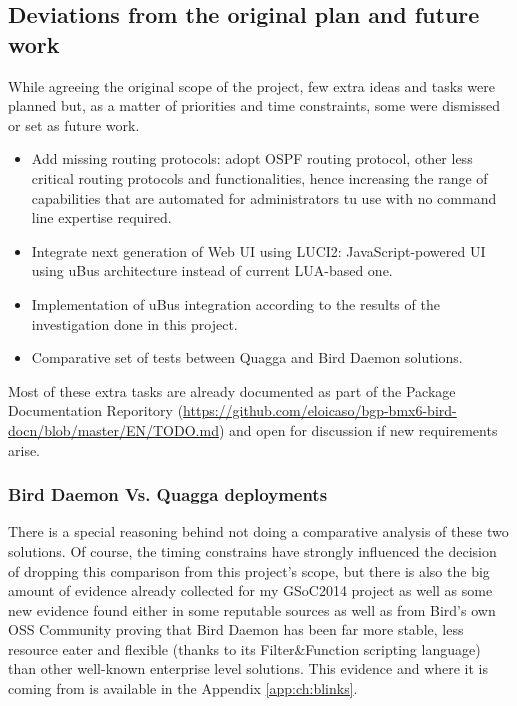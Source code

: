 \subsection{Deviations from the original plan and future work}
While agreeing the original scope of the project, few extra ideas and tasks were planned but, as a matter of priorities and time constraints, some were dismissed or set as future work.

\begin{itemize}
    \item Add missing routing protocols: adopt OSPF routing protocol, other less critical routing protocols and functionalities, hence increasing the range of capabilities that are automated for administrators tu use  with no command line expertise required.
    \item Integrate next generation of Web UI using LUCI2: JavaScript-powered UI using uBus architecture instead of current LUA-based one.
    \item Implementation of uBus integration according to the results of the investigation done in this project.
    \item Comparative set of tests between Quagga and Bird Daemon solutions.
\end{itemize}

Most of these extra tasks are already documented as part of the Package Documentation Reporitory (\href{https://github.com/eloicaso/bgp-bmx6-bird-docn/blob/master/EN/TODO.md}{https://github.com/eloicaso/bgp-bmx6-bird-docn/blob/master/EN/TODO.md}) and open for discussion if new requirements arise.

\subsubsection{Bird Daemon Vs. Quagga deployments}
There is a special reasoning behind not doing a comparative analysis of these two solutions. Of course, the timing constrains have strongly influenced the decision of dropping this comparison from this project's scope, but there is also the big amount of evidence already collected for my GSoC2014 project as well as some new evidence found either in some reputable sources as well as from Bird's own OSS Community proving that Bird Daemon has been far more stable, less resource eater and flexible (thanks to its Filter\&Function scripting language) than other well-known enterprise level solutions. This evidence and where it is coming from is available in the Appendix \ref{app:ch:blinks}.


